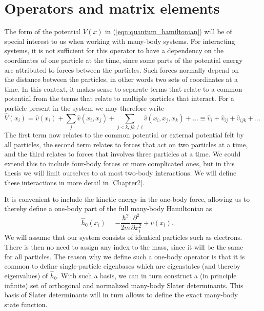 \section{Operators and matrix elements}

The form of the potential $V(x)$ in (\ref{eqn:quantum_hamiltonian}) will
be of special interest to us when working with many-body systems. For
interacting systems, it is not sufficient for this operator to have a
dependency on the coordinates of one particle at the time, since some
parts of the potential energy are attributed to forces between the
particles. Such forces normally depend on the distance between the
particles, in other words two sets of coordinates at a time. In this
context, it makes sense to separate terms that relate to a common
potential from the terms that relate to multiple particles that
interact. For a particle present in the system we may therefore write
\begin{equation}
\hat{V}(x_i) = \hat{v}(x_i) + \sum_j \hat{v}(x_i, x_j) + \sum_{j<k, jk \neq i} \hat{v}(x_i, x_j, x_k) + ... \equiv \hat{v}_i + \hat{v}_{ij} + \hat{v}_{ijk} + ...
\label{eqn:potential_1}
\end{equation}
The first term now relates to the common potential or external
potential felt by all particles, the second term relates to forces
that act on two particles at a time, and the third relates to forces
that involves three particles at a time. We could extend this to
include four-body forces or more complicated ones, but in this thesis we will limit ourselves to at 
most two-body interactions.
We will define these interactions in more detail
in \ref{Chapter2}.

It is convenient to include the kinetic energy in the one-body force, allowing us to thereby define a one-body part of the full many-body Hamiltonian as 
\begin{equation}
\hat{h}_0(x_i) =  -\frac{\hbar^2}{2m} \frac{\partial^2}{\partial x_i^2} + v(x_i).
\label{eqn:onebodyforce}
\end{equation}
We will assume that our system consists of identical particles such as electrons. There is then no need to assign any index 
to the mass, since it will be the same for all particles.
The reason why we define such a one-body operator is that it is common to define single-particle eigenbases 
which are  eigenstates (and thereby eigenvalues)  of $\hat{h}_0$. With such a basis, we can in turn construct a (in principle infinite) set of orthogonal and normalized many-body Slater determinants. This basis of  Slater determinants will in turn
allows to define the exact many-body state function. 

